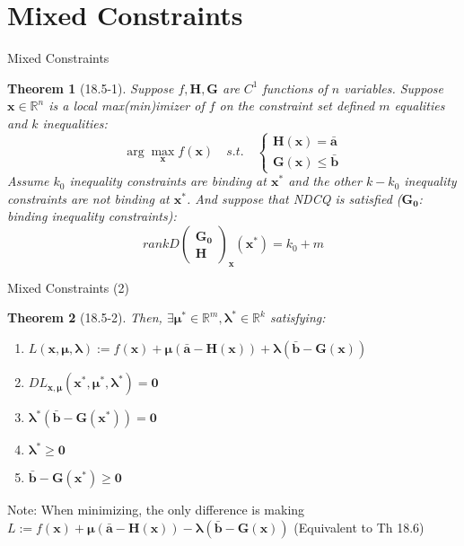 \documentclass[final]{beamer}
\newtheorem{thm}{Theorem}
\newcommand{\bb}{\mathbb}
\newcommand{\bd}{\mathbf}
\begin{document}
\section{Mixed Constraints} %
\label{sec:mixed_constraints}
\begin{frame}[t]{Mixed Constraints}
	\begin{thm}
		[18.5-1] Suppose $f,\bd{H},\bd{G}$ are $C^1$ functions of $n$ variables. Suppose $\bd{x}\in\bb{R}^n$ is a local max(min)imizer of $f$ on the constraint set defined $m$ equalities and $k$ inequalities:\[
			\arg\max_{\bd{x}}f(\bd{x}) \quad s.t.\quad \begin{cases}
				\bd{H(\bd{x})}=\bar{\bd{a}}\\
				\bd{G(\bd{x})}\le\bar{\bd{b}}
			\end{cases}
		\]
		Assume $k_0$ inequality constraints are binding at $\bd{x^\ast}$ and the other $k-k_0$ inequality constraints are not binding at $\bd{x^\ast}$. And suppose that NDCQ is satisfied ($\bd{G_0}$: binding inequality constraints):\[
			rank  D\begin{pmatrix}
				\bd{G_0}\\
				\bd{H}
			\end{pmatrix}_{\bd{x}}(\bd{x^\ast}) = k_0 + m
		\]
	\end{thm}
\end{frame}
\begin{frame}[t]{Mixed Constraints (2)}
	\begin{thm}
		[18.5-2] Then, $\exists \bd{\mu^\ast}\in\bb{R}^m,\bd{\lambda^\ast}\in\bb{R}^k$ satisfying:
		\begin{enumerate}
			\item $L(\bd{x},\bd{\mu},\bd{\lambda}):=f(\bd{x})+\bd{\mu}(\bar{\bd{a}}-\bd{H}(\bd{x}))+\bd{\lambda}(\bar{\bd{b}}-\bd{G(\bd{x})})$
			\item $DL_{\bd{x},\bd{\mu}}(\bd{x^\ast},\bd{\mu^\ast},\bd{\lambda^\ast})=\bd{0}$
			\item $\bd{\lambda^\ast}(\bar{\bd{b}}-\bd{G}(\bd{x^\ast}))=\bd{0}$
			\item $\bd{\lambda^\ast}\ge \bd{0}$
			\item $\bar{\bd{b}}-\bd{G(\bd{x^\ast})}\ge \bd{0}$
		\end{enumerate}
	\end{thm}
	Note: When minimizing, the only difference is making $L:=f(\bd{x})+\bd{\mu}(\bar{\bd{a}}-\bd{H}(\bd{x}))-\bd{\lambda}(\bar{\bd{b}}-\bd{G(\bd{x})})$ (Equivalent to Th 18.6)
\end{frame}
\end{document}
